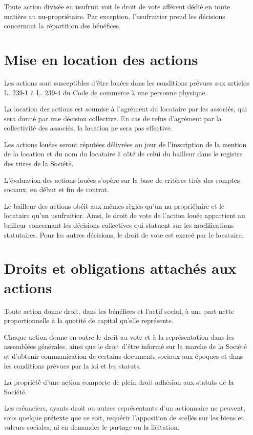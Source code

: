 \documentclass[a4paper,12pt]{report}
\begin{document}
Toute action divisée en usufruit voit le droit de vote afférent dédié en toute matière au nu-propriétaire. 
Par exception, l'usufruitier prend les décisions concernant la répartition des bénéfices.

\section{Mise en location des actions}
Les actions sont susceptibles d'être louées dans les conditions prévues aux articles L. 239-1 à L. 239-4 du Code de commerce à une personne physique.

La location des actions est soumise à l'agrément du locataire par les associés, qui sera donné par une décision collective. 
En cas de refus d'agrément par la collectivité des associés, la location ne sera pas effective.

Les actions louées seront réputées délivrées au jour de l'inscription de la mention de la location et du nom du locataire 
à côté de celui du bailleur dans le registre des titres de la Société.

L'évaluation des actions louées s'opère sur la base de critères tirés des comptes sociaux, en début et fin de contrat.

Le bailleur des actions obéit aux mêmes règles qu'un nu-propriétaire et le locataire qu'un usufruitier. 
Ainsi, le droit de vote de l'action louée appartient au bailleur concernant les décisions collectives qui statuent sur les modifications statutaires. 
Pour les autres décisions, le droit de vote est exercé par le locataire.

\section{Droits et obligations attachés aux actions}
Toute action donne droit, dans les bénéfices et l'actif social, à une part nette proportionnelle à la quotité de capital qu'elle représente.

Chaque action donne en outre le droit au vote et à la représentation dans les assemblées générales, 
ainsi que le droit d'être informé sur la marche de la Société et d'obtenir communication de certains documents sociaux aux époques 
et dans les conditions prévues par la loi et les statuts.

La propriété d'une action comporte de plein droit adhésion aux statuts de la Société.

Les créanciers, ayants droit ou autres représentants d'un actionnaire ne peuvent, sous quelque prétexte que ce soit, 
requérir l'apposition de scellés sur les biens et valeurs sociales, ni en demander le partage ou la licitation.
\end{document}
